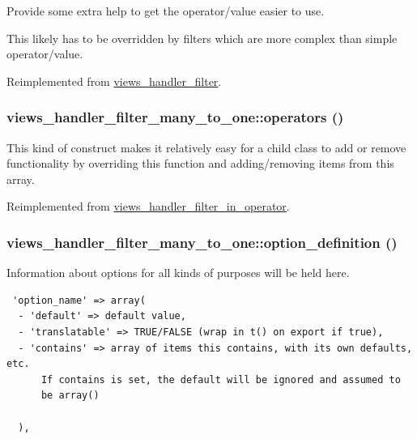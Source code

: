 Provide some extra help to get the operator/value easier to use.

This likely has to be overridden by filters which are more complex than simple operator/value. 

Reimplemented from \hyperlink{classviews__handler__filter_8bae65467710eb5f6cf6c2c46bd51c7b}{views\_\-handler\_\-filter}.\hypertarget{classviews__handler__filter__many__to__one_e397d071d9f55b4053b88f01572e700f}{
\subsubsection[{operators}]{\setlength{\rightskip}{0pt plus 5cm}views\_\-handler\_\-filter\_\-many\_\-to\_\-one::operators ()}}
\label{classviews__handler__filter__many__to__one_e397d071d9f55b4053b88f01572e700f}


This kind of construct makes it relatively easy for a child class to add or remove functionality by overriding this function and adding/removing items from this array. 

Reimplemented from \hyperlink{classviews__handler__filter__in__operator_e22d2c1d388a5b1457960c492ffc1fe1}{views\_\-handler\_\-filter\_\-in\_\-operator}.\hypertarget{classviews__handler__filter__many__to__one_e72e4f1ca6a64f22737671275d8d7a92}{
\subsubsection[{option\_\-definition}]{\setlength{\rightskip}{0pt plus 5cm}views\_\-handler\_\-filter\_\-many\_\-to\_\-one::option\_\-definition ()}}
\label{classviews__handler__filter__many__to__one_e72e4f1ca6a64f22737671275d8d7a92}


Information about options for all kinds of purposes will be held here. 

\begin{Code}\begin{verbatim} 'option_name' => array(
  - 'default' => default value,
  - 'translatable' => TRUE/FALSE (wrap in t() on export if true),
  - 'contains' => array of items this contains, with its own defaults, etc.
      If contains is set, the default will be ignored and assumed to
      be array()

  ),
\end{verbatim}
\end{Code}

